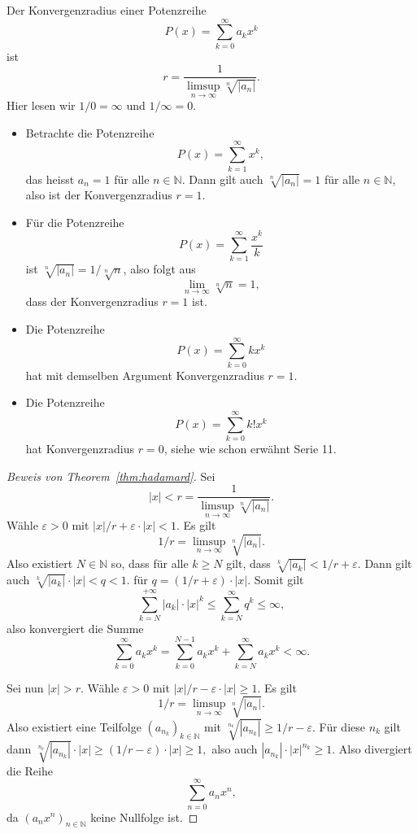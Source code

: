 \documentclass[../main.tex]{subfiles}
\begin{document}
\begin{theorem}\label{thm:hadamard}
  Der Konvergenzradius einer Potenzreihe
  \[
    P(x) = \sum_{k=0}^{\infty} a_k x^k
  \]
  ist
  \[
    r = \frac{1}{\limsup_{n \to \infty} \sqrt[n]{|a_n|}}.
  \]
  Hier lesen wir $1/0 = \infty$ und $1/\infty = 0$.
\end{theorem}

\begin{examples}
  \leavevmode
  \begin{itemize}
    \item Betrachte die Potenzreihe
      \[
        P(x) = \sum_{k=1}^{\infty} x^k,
      \]
      das heisst $a_n = 1$ für alle $n \in \mathbb{N}$.
      Dann gilt auch $\sqrt[n]{|a_n|} = 1$ für alle $n \in \mathbb{N}$,
      also ist der Konvergenzradius $r = 1$.
    \item Für die Potenzreihe
      \[
        P(x) = \sum_{k=1}^{\infty} \frac{x^k}{k}
      \]
      ist $\sqrt[n]{|a_n|} = 1/\sqrt[n]{n}$, also folgt aus
      \[
        \lim_{n \to \infty} \sqrt[n]{n} = 1,
      \]
      dass der Konvergenzradius $r = 1$ ist.
    \item Die Potenzreihe
      \[
        P(x) = \sum_{k=0}^{\infty} k x^k
      \]
      hat mit demselben Argument Konvergenzradius $r = 1$.
    \item Die Potenzreihe
      \[
        P(x) = \sum_{k=0}^{\infty} k! x^k
      \]
      hat Konvergenzradius $r = 0$, siehe wie schon erwähnt Serie 11.
  \end{itemize}
\end{examples}

\begin{proof}[Beweis von Theorem~\ref{thm:hadamard}]
  Sei \[|x| < r = \frac{1}{\limsup_{n \to \infty} \sqrt[n]{|a_n|}}.\]
  Wähle $\varepsilon > 0$ mit $|x|/r + \varepsilon \cdot |x| < 1$.
  Es gilt
  \[
    1/r = \limsup_{n \to \infty} \sqrt[n]{|a_n|}.
  \]
  Also existiert $N \in \mathbb{N}$ so,
  dass für alle $k \geq N$ gilt, dass
  \(
    \sqrt[k]{|a_k|} < 1/r + \varepsilon.
  \)
  Dann gilt auch
  \(
    \sqrt[k]{|a_k|} \cdot |x| < q < 1.
  \)
  für
  \(
    q = (1/r + \varepsilon) \cdot |x|.
  \)
  Somit gilt
  \[
    \sum_{k=N}^{+\infty} |a_k| \cdot |x|^k \leq \sum_{k=N}^{\infty} q^k \leq \infty,
  \]
  also konvergiert die Summe
  \[
    \sum_{k=0}^{\infty} a_k x^k = \sum_{k=0}^{N-1} a_k x^k + \sum_{k=N}^{\infty} a_k x^k < \infty.
  \]
  
  Sei nun $|x| > r$. Wähle $\varepsilon > 0$ mit $|x|/r - \varepsilon \cdot |x| \geq 1$.
  Es gilt
   \[
     1/r = \limsup_{n \to \infty} \sqrt[n]{|a_n|}.
  \]
  Also existiert eine Teilfolge ${(a_{n_k})}_{k \in \mathbb{N}}$ mit
  \(
    \sqrt[n_k]{|a_{n_k}|} \geq 1/r - \varepsilon.
  \)
  Für diese $n_k$ gilt dann
  \(
    \sqrt[n_k]{|a_{n_k}|} \cdot |x| \geq (1/r -\varepsilon) \cdot |x| \geq 1,
  \)
  also auch $|a_{n_k}| \cdot |x|^{n_k} \geq 1$. Also divergiert die Reihe
  \[
    \sum_{n=0}^{\infty} a_n x^n,
  \]
  da $ {(a_n x^n)}_{n \in \mathbb{N}}$ keine Nullfolge ist.
\end{proof}
\end{document}

